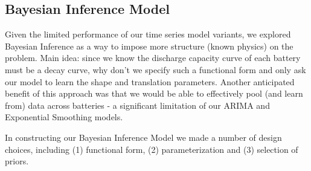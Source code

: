 \documentclass{article}
\begin{document}
\subsection{Bayesian Inference Model}
Given the limited performance of our time series model variants, we explored Bayesian Inference as a way to impose more structure (known physics) on the problem. Main idea: since we know the discharge capacity curve of each battery must be a decay curve, why don't we specify such a functional form and only ask our model to learn the shape and translation parameters. Another anticipated benefit of this approach was that we would be able to effectively pool (and learn from) data across batteries - a significant limitation of our ARIMA and Exponential Smoothing models.

In constructing our Bayesian Inference Model we made a number of design choices, including (1) functional form, (2) parameterization and (3) selection of priors.
\end{document}
